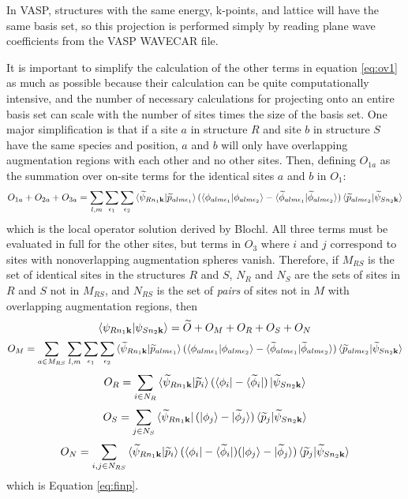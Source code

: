 \documentclass[12pt]{article}
\begin{document}
In VASP, structures with the same energy, k-points, and lattice will have the same basis set,
so this projection is performed simply by reading plane wave coefficients from the VASP WAVECAR file.

It is important to simplify the calculation of the other terms in equation \ref{eq:ov1} as much
as possible because their calculation can be quite computationally intensive, and the number of
necessary calculations for projecting onto an entire basis set can scale with the number
of sites times the size of the basis set. One major simplification is that if a site $a$ in structure
$R$ and site $b$ in structure $S$ have the same species and position, $a$ and $b$ will only have
overlapping augmentation regions with each other and no other sites. Then, defining $O_{1a}$
as the summation over on-site terms for the identical sites $a$ and $b$ in $O_1$:
$$O_{1a}+O_{2a}+O_{3a}=\sum_{l,m}\sum_{\epsilon_1}\sum_{\epsilon_2}
\braket{\widetilde{\psi}_{Rn_1\mathbf{k}}|\widetilde{p}_{alm\epsilon _1}}
(\braket{\phi_{alm\epsilon _1}|{\phi_{alm\epsilon _2}}}
-\braket{\widetilde{\phi}_{alm\epsilon _1}|\widetilde{\phi}_{alm\epsilon _2}})
\braket{\widetilde{p}_{alm\epsilon _2}|\widetilde{\psi}_{Sn_2\mathbf{k}}}$$
which is the local operator solution derived by Blochl. All three terms must
be evaluated in full for the other sites, but terms in $O_3$ where $i$ and $j$ correspond
to sites with nonoverlapping augmentation spheres vanish. Therefore, if $M_{RS}$ is the set
of identical sites in the structures $R$ and $S$, $N_R$ and $N_S$ are the sets of sites
in $R$ and $S$ not in $M_{RS}$, and $N_{RS}$ is the set of \emph{pairs} of sites not in
$M$ with overlapping augmentation regions, then
$$
\braket{\psi_{Rn_1\mathbf{k}}|\psi_{Sn_2\mathbf{k}}}=\widetilde{O}+O_M+O_R+O_S+O_N
$$
$$
O_M=\sum_{a\in M_{RS}}\sum_{l,m}\sum_{\epsilon_1}\sum_{\epsilon_2}
\braket{\widetilde{\psi}_{Rn_1\mathbf{k}}|\widetilde{p}_{alm\epsilon _1}}
(\braket{\phi_{alm\epsilon _1}|{\phi_{alm\epsilon _2}}}
-\braket{\widetilde{\phi}_{alm\epsilon _1}|\widetilde{\phi}_{alm\epsilon _2}})
\braket{\widetilde{p}_{alm\epsilon _2}|\widetilde{\psi}_{Sn_2\mathbf{k}}}
$$
$$
O_R=\sum_{i\in N_R}\braket{\widetilde{\psi}_{Rn_1\mathbf{k}}|\widetilde{p}_i}
(\bra{\phi_i}-\bra{\widetilde{\phi}_i})
\ket{\widetilde{\psi}_{Sn_2\mathbf{k}}}
$$
$$
O_S=\sum_{j\in N_S}\bra{\widetilde{\psi}_{Rn_1\mathbf{k}}}(\ket{\phi_j}-\ket{\widetilde{\phi}_j})
\braket{\widetilde{p}_j|\widetilde{\psi}_{Sn_2\mathbf{k}}}
$$
$$
O_N=\sum_{i,j\in N_{RS}}\braket{\widetilde{\psi}_{Rn_1\mathbf{k}}|
\widetilde{p}_i}(\bra{\phi_i}-\bra{\widetilde{\phi}_i})
(\ket{\phi_j}-\ket{\widetilde{\phi}_j})\braket{\widetilde{p}_j|\widetilde{\psi}_{Sn_2\mathbf{k}}}
$$
which is Equation \ref{eq:finp}.
\end{document}
